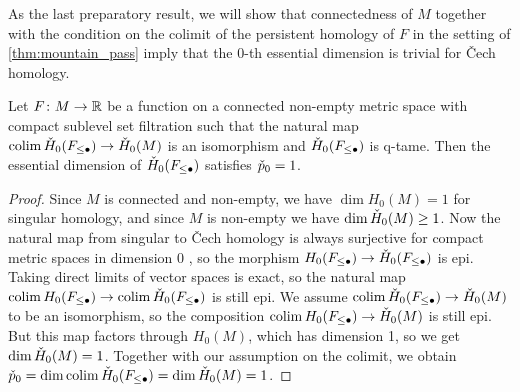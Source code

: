 As the last preparatory result, we will show that connectedness of $M$ together with the condition on the colimit of the persistent homology of $F$ in the setting of \cref{thm:mountain_pass} imply that the $0$-th essential dimension is trivial for \v{C}ech homology.

\begin{lem}
\label{lem:essential_cech_dim}
	Let $F \colon M \to \mathbb{R}$ be a function on a connected non-empty metric space with compact sublevel set filtration such that the natural map $\operatorname*{colim} \check{H}_0(F_{\leq \bullet}) \to \check{H}_0(M)$ is an isomorphism and $\check{H}_0(F_{\leq \bullet})$ is q-tame.
	Then the essential dimension of $\check{H}_0(F_{\leq \bullet})$ satisfies $\check{p}_{0} = 1$.
\end{lem}
\begin{proof}
	Since $M$ is connected and non-empty, we have $\dim H_{0}(M) = 1$ for singular homology, and since $M$ is non-empty we have $\dim \check{H}_0(M) \geq 1$.
	Now the natural map from singular to \v{C}ech homology is always surjective for compact metric spaces in dimension 0 \cite{Eda.2000}, so the morphism $H_{0}(F_{\leq \bullet}) \to \check{H}_{0}(F_{\leq \bullet})$ is epi.
	Taking direct limits of vector spaces is exact, so the natural map $\operatorname*{colim} H_{0}(F_{\leq \bullet}) \to \operatorname*{colim} \check{H}_{0}(F_{\leq \bullet})$ is still epi. 
	We assume $\operatorname*{colim} \check{H}_0(F_{\leq \bullet}) \to \check{H}_0(M)$ to be an isomorphism, so the composition $\operatorname*{colim} H_0(F_{\leq \bullet}) \to \check{H}_0(M)$ is still epi.
	But this map factors through $H_{0}(M)$, which has dimension 1, so we get $\dim \check{H}_0(M) = 1$.
	Together with our assumption on the colimit, we obtain $\check{p}_0 = \dim \operatorname*{colim} \check{H}_0(F_{\leq \bullet}) = \dim \check{H}_0(M) = 1$.
\end{proof}

